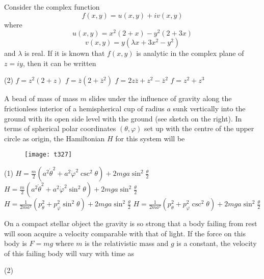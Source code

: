\begin{questions}
\begin{minipage}{\textwidth}
	\question Consider the complex function
	$$
	f(x, y)=u(x, y)+i v(x, y)
	$$
	where
	$$
	u(x, y)=x^{2}(2+x)-y^{2}(2+3 x)
	$$
	$$
	v(x, y)=y\left(\lambda x+3 x^{2}-y^{2}\right)
	$$
	and $\lambda$ is real. If it is known that $f(x, y)$ is analytic in the complex plane of $z=i y$, then it can be written
\end{minipage}
\begin{tasks}(2)
	\task[\textbf{A.}] $f=z^{2}(2+z)$
	\task[\textbf{B.}] $f=\bar{z}\left(2+\bar{z}^{2}\right)$
	\task[\textbf{C.}]   $f=2 z \bar{z}+z^{2}-\bar{z}^{2}$
	\task[\textbf{D.}] $f=z^{2}+z^{3}$
\end{tasks}
\begin{minipage}{\textwidth}
	\question A bead of mass of mass $m$ slides under the influence of gravity along the frictionless interior of a hemispherical cup of radius $a$ sunk vertically into the ground with its open side level with the ground (see sketch on the right). In terms of spherical polar coordinates $(\theta, \varphi)$ set up with the centre of the upper circle as origin, the Hamiltonian $H$ for this system will be
\end{minipage}
\begin{figure}[H]
	\centering
	\texttt{[image: t327]}
\end{figure}
\begin{tasks}(1)
	\task[\textbf{A.}]   $H=\frac{m}{2}\left(a^{2} \dot{\theta}^{2}+a^{2} \dot{\varphi}^{2} \csc ^{2} \theta\right)+2 m g a \sin ^{2} \frac{\theta}{2}$
	\task[\textbf{B.}] $H=\frac{m}{2}\left(a^{2} \dot{\theta}^{2}+a^{2} \dot{\varphi}^{2} \sin ^{2} \theta\right)+2 m g a \sin ^{2} \frac{\theta}{2}$
	\task[\textbf{C.}]   $H=\frac{1}{2 m a^{2}}\left(p_{\theta}^{2}+p_{\varphi}^{2} \sin ^{2} \theta\right)+2 m g a \sin ^{2} \frac{\theta}{2}$
	\task[\textbf{D.}] $H=\frac{1}{2 m a^{2}}\left(p_{\theta}^{2}+p_{\varphi}^{2} \csc ^{2} \theta\right)+2 m g a \sin ^{2} \frac{\theta}{2}$
\end{tasks}
\begin{minipage}{\textwidth}
	\question On a compact stellar object the gravity is so strong that a body failing from rest will soon acquire a velocity comparable with that of light. If the force on this body is $F=m g$ where $m$ is the relativistic mass and $g$ is a constant, the velocity of this failing body will vary with time as
\end{minipage}
\begin{tasks}(2)

\end{tasks}
\end{questions}
